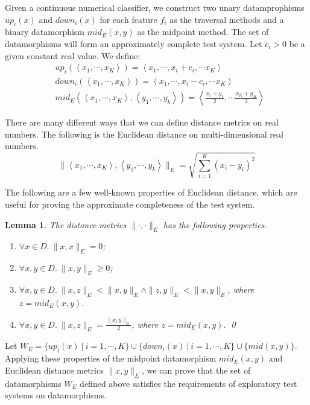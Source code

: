 \documentclass[preprint,1p,authoryear,times]{elsarticle}
\newtheorem{Lemma}{Lemma}
\begin{document}
Given a continuous numerical classifier, we construct two unary datamprophisms $up_i(x)$ and $down_i(x)$ for each feature $f_i$ as the traversal methods and a binary datamorphism $mid_E(x,y)$ as the midpoint method. The set of datamorphisms will form an approximately complete test system. Let $c_i>0$ be a given constant real value. We define:
\begin{eqnarray}
& up_i(\left<x_1,\cdots, x_K\right>)=\left<x_1, \cdots, x_i+c_i, \cdots x_K\right> \label{eqn:e2_6}\\
& down_i(\left<x_1,\cdots, x_K\right>)=\left<x_1, \cdots, x_i-c_i, \cdots x_K\right> \label{eqn:e2_7}\\
& mid_E(\left<x_1,\cdots, x_K\right>, \left<y_1, \cdots, y_k\right>)=\left<\frac{x_1+y_1}{2}, \cdots \frac{x_K + y_K}{2}\right> \label{eqn:e2_8}
\end{eqnarray}

There are many different ways that we can define distance metrics on real numbers. The following is the Euclidean distance on multi-dimensional real numbers. 
\begin{equation}
\|\left<x_1,\cdots, x_K\right>, \left<y_1, \cdots, y_k\right>\|_E=\sqrt{\sum_{i=1}^{K}{(x_i -y_i)^2}} \label{eq18}
\end{equation}

The following are a few well-known properties of Euclidean distance, which are useful for proving the approximate completeness of the test system. 
\begin{Lemma}\label{lmm:Lmm2_5}
The distance metrics $\|\cdot,\cdot\|_E$ has the following properties. 
\begin{enumerate}
\item $\forall x \in D.~\|x,x\|_E=0$;
\item $\forall x, y \in D.~\|x,y\|_E \geq 0$; 
\item $\forall x,y \in D.~\|x, z\|_E < \|x,y\|_E \wedge \|z,y\|_E < \|x, y\|_E$, where $z=mid_E(x,y)$. 
\item $\forall x,y \in D.~\|x,z\|_E = \frac{\|x,y\|_E}{2}$, where $z=mid_E(x,y)$. \qed
\end{enumerate}
\end{Lemma}

Let $W_E = \{ up_i(x) ~|~ i=1, \cdots, K\} \cup \{down_i(x) ~|~ i=1, \cdots, K\} \cup \{mid(x,y)\}$.
Applying these properties of the midpoint datamorphism $mid_E(x,y)$ and Euclidean distance metrics $\|x,y\|_E$, we can prove that the set of datamorphisms $W_E$ defined above satisfies the requirements of exploratory test systems on datamorphisms.
\end{document}

